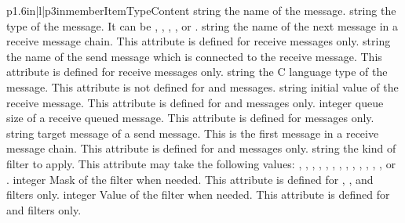 \begin{longtableiii}{p{1.6in}|l|p{3in}}{member}{Item}{Type}{Content}
  {string}
  {the name of the message.}
  {string}
  {the type of the message. It can be {\small{}, , , ,  or }.}
  {string}
  {the name of the next message in a receive message chain. This attribute is defined for receive messages only.}
  {string}
  {the name of the send message which is connected to the receive message. This attribute is defined for receive messages only.}
  {string}
  {the C language type of the message. This attribute is not defined for {\small{}} and  {\small{}} messages.}
  {string}
  {initial value of the receive message. This attribute is defined for {\small{}} and  {\small{}} messages only.}
  {integer}
  {queue size of a receive queued message. This attribute is defined for {\small{}} messages only.}
  {string}
  {target message of a send message. This is the first message in a receive message chain. This attribute is defined for {\small{}} and {\small{}} messages only.}
  {string}
  {the kind of filter to apply. This attribute may take the following values: {\small{}, , , , , , , , , , , , , } or {\small{}}.}
  {integer}
  {Mask of the filter when needed. This attribute is defined for {\small{}, , } and {\small{}} filters only.}
  {integer}
  {Value of the filter when needed. This attribute is defined for {\small{}} and {\small{}} filters only.}

\end{longtableiii}
